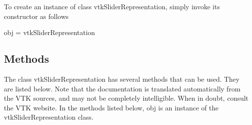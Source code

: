 To create an instance of class vtk\-Slider\-Representation, simply invoke its constructor as follows \begin{DoxyVerb}  obj = vtkSliderRepresentation
\end{DoxyVerb}
 \hypertarget{vtkwidgets_vtkxyplotwidget_Methods}{}\subsection{Methods}\label{vtkwidgets_vtkxyplotwidget_Methods}
The class vtk\-Slider\-Representation has several methods that can be used. They are listed below. Note that the documentation is translated automatically from the V\-T\-K sources, and may not be completely intelligible. When in doubt, consult the V\-T\-K website. In the methods listed below, {\ttfamily obj} is an instance of the vtk\-Slider\-Representation class. 
